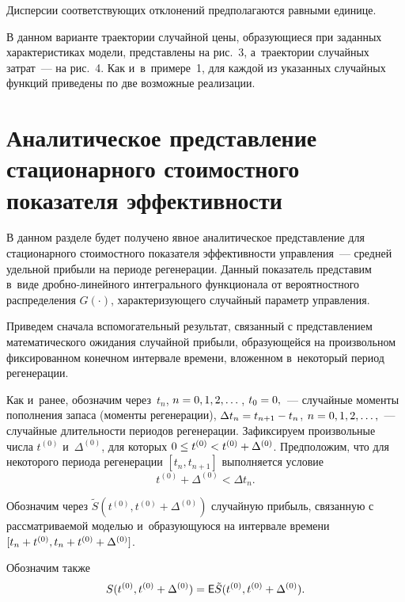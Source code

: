 \begin{multicols}{2}
\vspace*{-6pt}

Дисперсии соответствующих отклонений предполагаются равными единице.


В данном варианте траектории случайной цены, образующиеся при заданных 
характеристиках модели, представлены на рис.~3, а~траектории случайных затрат~--- 
на рис.~4. Как и~в~примере~1, для каждой из указанных случайных функций 
приведены по две возможные реализации.

\vspace*{-6pt}


\section{Аналитическое представление стационарного стоимостного показателя 
эффективности}

\vspace*{-3pt}

В данном разделе будет получено явное аналитическое представление для 
стационарного стоимостного показателя эффективности управления~--- средней 
удельной прибыли на периоде \mbox{регенерации}. Данный показатель представим в~виде 
дроб\-но-ли\-ней\-но\-го интегрального функционала от вероятностного распределения 
$G(\cdot)$, характеризующего случайный параметр управления.

Приведем сначала вспомогательный результат, связанный с представлением 
математического ожидания случайной прибыли, образующейся на произвольном 
фиксированном конечном интервале времени, вложенном в~некоторый период 
регенерации.

Как и~ранее, обозначим через~$t_n$, $n\hm=0,1,2,\dots$, $t_0\hm=0,$~--- случайные моменты 
пополнения запаса (моменты регенерации), $\Delta t_n\hm=t_{n+1}\hm-
t_n$, $n\hm=0,1,2,\dots,$~--- случайные длительности периодов регенерации. Зафиксируем 
произвольные чис\-ла $t^{(0)}$ и~$\Delta^{(0)}$, для которых $0\hm \leq t^{(0)} \hm< 
t^{(0)} + \Delta^{(0)}$. Предположим, что для некоторого периода регенерации 
$[t_n, t_{n+1}]$ выполняется условие 
$$
t^{(0)} + \Delta^{(0)} <\Delta t_n.
$$
 
Обозначим через $\tilde{S}(t^{(0)}, t^{(0)} + \Delta^{(0)})$ случайную прибыль, 
связанную с рассматриваемой моделью и~образующуюся на интервале времени 
$[t_n\hm+t^{(0)}, t_n\hm + t^{(0)} \hm+ \Delta^{(0)}]$.

Обозначим также 
$$
S(t^{(0)}, t^{(0)} + \Delta^{(0)}) = {\sf E}\tilde{S}(t^{(0)}, 
t^{(0)} +\Delta^{(0)}).
$$



\end{multicols}
